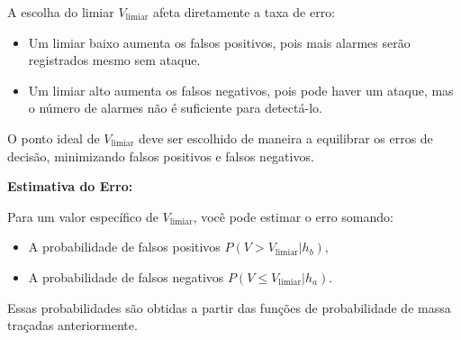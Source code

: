 \documentclass[12 pt]{article}
\begin{document}
\begin{enumerate}
\begin{tcolorbox}[colback=white, colframe=black, title=Resposta (continuação):]
        A escolha do limiar \( V_{\text{limiar}} \) afeta diretamente a taxa de erro:

        \begin{itemize}
            \item Um limiar baixo aumenta os falsos positivos, pois mais alarmes serão registrados mesmo sem ataque.
            \item Um limiar alto aumenta os falsos negativos, pois pode haver um ataque, mas o número de alarmes não é suficiente para detectá-lo.
        \end{itemize}
        
        O ponto ideal de \( V_{\text{limiar}} \) deve ser escolhido de maneira a equilibrar os erros de decisão, minimizando falsos positivos e falsos negativos.
        
        \textbf{Estimativa do Erro:}
        
        Para um valor específico de \( V_{\text{limiar}} \), você pode estimar o erro somando:
        \begin{itemize}
            \item A probabilidade de falsos positivos \( P(V > V_{\text{limiar}} | h_b) \),
            \item A probabilidade de falsos negativos \( P(V \leq V_{\text{limiar}} | h_a) \).
        \end{itemize}

        Essas probabilidades são obtidas a partir das funções de probabilidade de massa traçadas anteriormente.
        
    
    \end{tcolorbox}










\end{enumerate}
\end{document}
